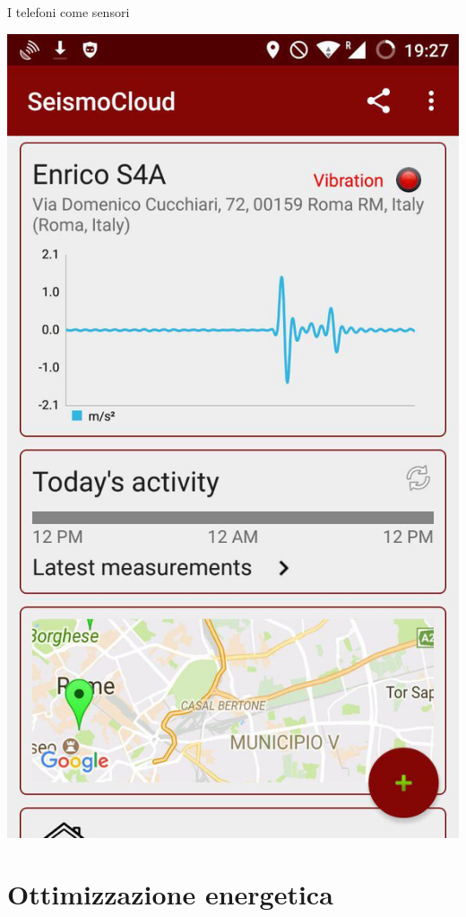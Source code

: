 \begin{frame}[c]{I telefoni come sensori}
\begin{center}
\includegraphics[scale=0.15]{app/main}
\end{center}
\end{frame}

\section{Ottimizzazione energetica}

